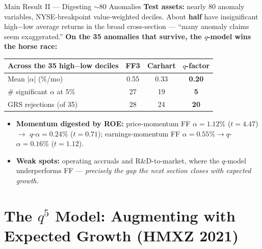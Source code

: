 \documentclass{beamer}
\begin{document}
\begin{frame}{Main Result II --- Digesting $\sim$80 Anomalies}
	\textbf{Test assets:} nearly 80 anomaly variables, NYSE-breakpoint value-weighted deciles. About \textbf{half} have insignificant high$-$low average returns in the broad cross-section --- ``many anomaly claims seem exaggerated.''
	\vspace{1pt}
	\textbf{On the 35 anomalies that survive, the $q$-model wins the horse race:}
	\begin{center}
		\small
		\begin{tabular}{@{}lccc@{}}
			\toprule
			Across the 35 high$-$low deciles & FF3 & Carhart & \textbf{$q$-factor} \\
			\midrule
			Mean $|\alpha|$ (\%/mo)             & 0.55 & 0.33 & \textbf{0.20} \\
			\# significant $\alpha$ at 5\%       & 27   & 19   & \textbf{5} \\
			GRS rejections (of 35)              & 28   & 24   & \textbf{20} \\
			\bottomrule
		\end{tabular}
	\end{center}
	\begin{itemize}
		\item \textbf{Momentum digested by ROE:} price-momentum FF $\alpha=1.12\%$ ($t=4.47$) $\to$ $q$-$\alpha=0.24\%$ ($t=0.71$); earnings-momentum FF $\alpha=0.55\%\to q$-$\alpha=0.16\%$ ($t=1.12$).
		\item \textbf{Weak spots:} operating accruals and R\&D-to-market, where the $q$-model underperforms FF --- \textit{precisely the gap the next section closes with expected growth.}
	\end{itemize}
\end{frame}

\section{The \texorpdfstring{$q^5$}{q5} Model: Augmenting with Expected Growth (HMXZ 2021)}
\end{document}
